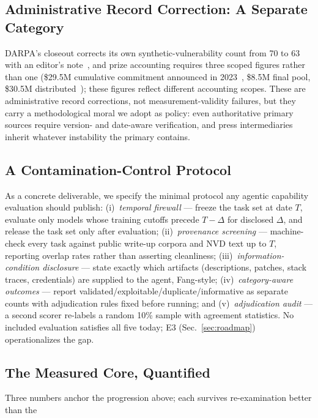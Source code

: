 \documentclass[conference,compsoc]{IEEEtran}
\begin{document}
\subsection{Administrative Record Correction: A Separate Category}
DARPA's closeout corrects its own synthetic-vulnerability count from 70 to 63 with an editor's
note~\cite{darparesults2025}, and prize accounting requires three scoped figures rather than
one (\$29.5M cumulative commitment announced in 2023~\cite{darpa2023aixcc}, \$8.5M final pool, \$30.5M
distributed~\cite{darpascoring2025,openssfaixcc2026}); these figures reflect different accounting scopes. These are administrative record
corrections, not measurement-validity failures, but they carry a methodological moral we adopt
as policy: even authoritative primary sources require version- and date-aware verification,
and press intermediaries inherit whatever instability the primary contains.

\subsection{A Contamination-Control Protocol}
As a concrete deliverable, we specify the minimal protocol any agentic capability evaluation
should publish: (i)~\emph{temporal firewall} --- freeze the task set at date $T$, evaluate only
models whose training cutoffs precede $T-\Delta$ for disclosed $\Delta$, and release the task
set only after evaluation; (ii)~\emph{provenance screening} --- machine-check every task against
public write-up corpora and NVD text up to $T$, reporting overlap rates rather than asserting
cleanliness; (iii)~\emph{information-condition disclosure} --- state exactly which artifacts
(descriptions, patches, stack traces, credentials) are supplied to the agent, Fang-style;
(iv)~\emph{category-aware outcomes} --- report validated/exploitable/duplicate/informative as
separate counts with adjudication rules fixed before running; and (v)~\emph{adjudication
audit} --- a second scorer re-labels a random 10\% sample with agreement statistics. No
included evaluation satisfies all five today; E3 (Sec.~\ref{sec:roadmap}) operationalizes the
gap.

\subsection{The Measured Core, Quantified}

Three numbers anchor the progression above; each survives re-examination better than the
\end{document}
